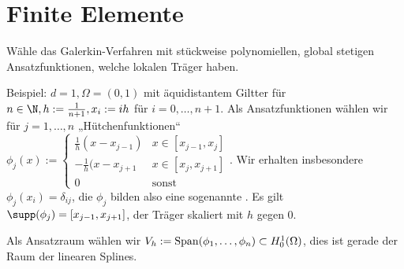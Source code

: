 \section{Finite Elemente} \label{sec:3.4}


Wähle das Galerkin-Verfahren mit stückweise polynomiellen, global stetigen Ansatzfunktionen, welche lokalen Träger haben.

Beispiel: $d = 1, \Omega = (0,1)$ mit äquidistantem Giltter für $n \in \N, h := \frac{1}{n+1}, x_i := i h$ für $i = 0, \dotsc, n + 1$.
Als Ansatzfunktionen wählen wir für $j = 1, \dotsc, n$ „Hütchenfunktionen“
\begin{math}
	\phi_j(x) := \begin{cases}
		\frac{1}{h} (x - x_{j-1}) & x \in [x_{j-1}, x_j] \\
		-\frac{1}{h} (x - x_{j+1} & x \in [x_j, x_{j+1}] \\
		0 & \text{sonst}
	\end{cases}.
\end{math}
Wir erhalten insbesondere $\phi_j(x_i) = \delta_{ij}$, die $\phi_j$ bilden also eine sogenannte .
Es gilt $\supp(\phi_j) = [x_{j-1}, x_{j+1}]$, der Träger skaliert mit $h$ gegen $0$.

Als Ansatzraum wählen wir $V_h := \operatorname{Span}(\phi_1, \dotsc, \phi_n) \subset H_0^1(\Omega)$, dies ist gerade der Raum der linearen Splines.

